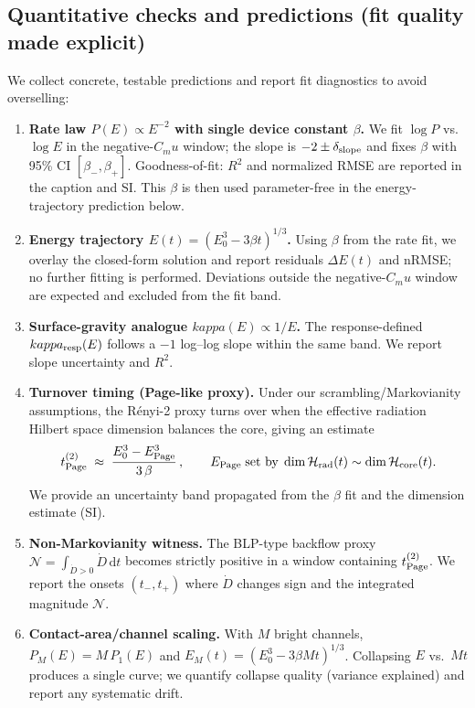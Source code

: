 \documentclass[aps,prx,onecolumn,showpacs,superscriptaddress,longbibliography,nofootinbib]{revtex4-2}
\def\kappa{kappa}%
\def\mu{mu}%
\begin{document}
\subsection{Quantitative checks and predictions (fit quality made explicit)}
We collect concrete, testable predictions and report fit diagnostics to avoid overselling:
\begin{enumerate}[leftmargin=*]
  \item \textbf{Rate law $P(E)\propto E^{-2}$ with single device constant $\beta$.} We fit $\log P$ vs.~$\log E$ in the negative-$C_\mu$ window; the slope is $-2\pm\delta_{\rm slope}$ and fixes $\beta$ with 95\% CI $[\beta_-,\beta_+]$. Goodness-of-fit: $R^2$ and normalized RMSE are reported in the caption and SI. This $\beta$ is then used parameter-free in the energy-trajectory prediction below.
  \item \textbf{Energy trajectory $E(t)=(E_0^3-3\beta t)^{1/3}$.} Using $\beta$ from the rate fit, we overlay the closed-form solution and report residuals $\Delta E(t)$ and nRMSE; no further fitting is performed. Deviations outside the negative-$C_\mu$ window are expected and excluded from the fit band.
  \item \textbf{Surface-gravity analogue $\kappa(E)\propto 1/E$.} The response-defined $\kappa_{\rm resp}(E)$ follows a $-1$ log--log slope within the same band. We report slope uncertainty and $R^2$.
  \item \textbf{Turnover timing (Page-like proxy).} Under our scrambling/Markovianity assumptions, the R\'enyi-2 proxy turns over when the effective radiation Hilbert space dimension balances the core, giving an estimate
  \begin{equation*}
    t_{\rm Page}^{(2)} \;\approx\; \frac{E_0^3 - E_{\rm Page}^3}{3\,\beta}\,,\qquad E_{\rm Page}\;\text{set by}\; \dim\mathcal{H}_{\rm rad}(t)\sim \dim\mathcal{H}_{\rm core}(t).
  \end{equation*}
  We provide an uncertainty band propagated from the $\beta$ fit and the dimension estimate (SI).
  \item \textbf{Non-Markovianity witness.} The BLP-type backflow proxy $\mathcal{N}=\int_{\dot D>0}\!\dot D\,\mathrm{d}t$ becomes strictly positive in a window containing $t_{\rm Page}^{(2)}$. We report the onsets $(t_-,t_+)$ where $\dot D$ changes sign and the integrated magnitude $\mathcal{N}$.
  \item \textbf{Contact-area/channel scaling.} With $M$ bright channels, $P_M(E)=M\,P_1(E)$ and $E_M(t)=(E_0^3-3\beta M t)^{1/3}$. Collapsing $E$ vs.~$M t$ produces a single curve; we quantify collapse quality (variance explained) and report any systematic drift.

\end{enumerate}
\end{document}
